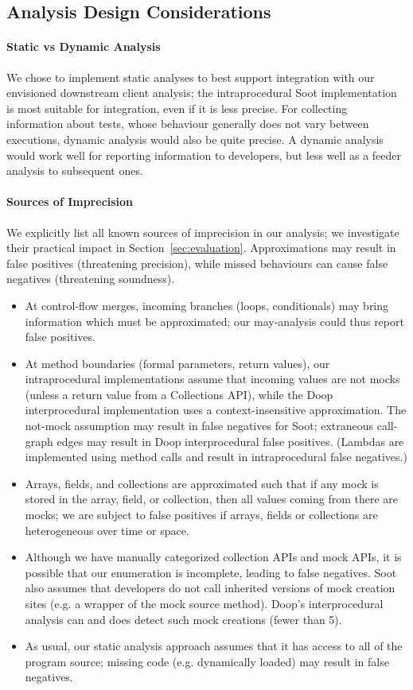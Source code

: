 \subsection{Analysis Design Considerations}
\label{subsec:analysis-design}
\paragraph{Static vs Dynamic Analysis}
We chose to implement static analyses to best support integration with our envisioned downstream client analysis; the intraprocedural Soot implementation is most suitable for integration, even if it is less precise. For collecting information about tests, whose behaviour generally does not vary between executions, dynamic analysis would also be quite precise. A dynamic analysis would work well for reporting information to developers, but less well as a feeder analysis to subsequent ones.

\paragraph{Sources of Imprecision}
We explicitly list all known sources of imprecision in our analysis; we investigate their practical impact in Section~\ref{sec:evaluation}.
Approximations may result in false positives (threatening precision), while missed behaviours can cause false negatives (threatening soundness).
\begin{itemize}[noitemsep]
\item At control-flow merges, incoming branches (loops, conditionals) may bring information which must be approximated; our may-analysis could thus report false positives.
\item At method boundaries (formal parameters, return values), our intraprocedural implementations assume that incoming values are not mocks (unless a return value from a Collections API), while the Doop interprocedural implementation uses a context-insensitive approximation. The not-mock assumption may result in false negatives for Soot; extraneous call-graph edges may result in Doop interprocedural false positives. (Lambdas are implemented using method calls and result in intraprocedural false negatives.)
\item Arrays, fields, and collections are approximated such that if any mock is stored in the array, field, or collection, then all values coming from there are mocks; we are subject to false positives if arrays, fields or collections are heterogeneous over time or space.
\item Although we have manually categorized collection APIs and mock APIs, it is possible that our enumeration is incomplete, leading to false negatives.
Soot also assumes that developers do not call inherited versions of mock creation sites (e.g. a wrapper of the mock source method). Doop's interprocedural analysis can and does detect such mock creations (fewer than 5).
  \item As usual, our static analysis approach assumes that it has access to all of the program source; missing code (e.g. dynamically loaded) may result in false negatives.
\end{itemize}

